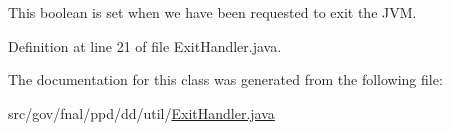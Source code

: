 This boolean is set when we have been requested to exit the J\-V\-M. 



Definition at line 21 of file Exit\-Handler.\-java.



The documentation for this class was generated from the following file\-:\begin{DoxyCompactItemize}
\item 
src/gov/fnal/ppd/dd/util/\hyperlink{ExitHandler_8java}{Exit\-Handler.\-java}\end{DoxyCompactItemize}
